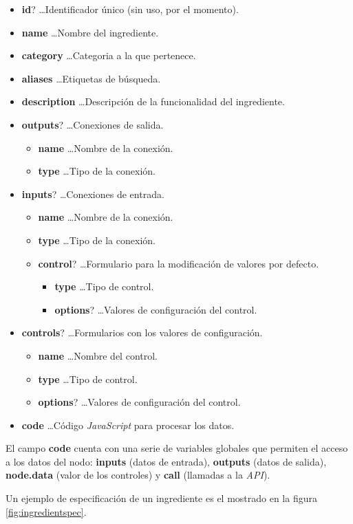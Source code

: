 \begin{itemize}
\item \textbf{id}? \ldots Identificador único (sin uso, por el momento).
\item \textbf{name} \ldots Nombre del ingrediente.
\item \textbf{category} \ldots Categoria a la que pertenece.
\item \textbf{aliases} \ldots Etiquetas de búsqueda.
\item \textbf{description} \ldots Descripción de la funcionalidad del ingrediente.
\item \textbf{outputs}? \ldots Conexiones de salida.
    \begin{itemize}
    \item \textbf{name} \ldots Nombre de la conexión.
    \item \textbf{type} \ldots Tipo de la conexión.
    \end{itemize}
\item \textbf{inputs}? \ldots Conexiones de entrada.
    \begin{itemize}
    \item \textbf{name} \ldots Nombre de la conexión.
    \item \textbf{type} \ldots Tipo de la conexión.
    \item \textbf{control}? \ldots Formulario para la modificación de valores por defecto.
        \begin{itemize}
        \item \textbf{type} \ldots Tipo de control.
        \item \textbf{options}? \ldots Valores de configuración del control.
        \end{itemize}
    \end{itemize}
\item \textbf{controls}? \ldots Formularios con los valores de configuración.
    \begin{itemize}
    \item \textbf{name} \ldots Nombre del control.
    \item \textbf{type} \ldots Tipo de control.
    \item \textbf{options}? \ldots Valores de configuración del control.
    \end{itemize}
\item \textbf{code} \ldots Código \textit{JavaScript} para procesar los datos.
\end{itemize}

El campo \textbf{code} cuenta con una serie de variables globales que permiten el acceso a los datos del nodo: \textbf{inputs} (datos de entrada), \textbf{outputs} (datos de salida), \textbf{node.data} (valor de los controles) y \textbf{call} (llamadas a la \textit{API}).\sn

Un ejemplo de especificación de un ingrediente es el mostrado en la figura \ref{fig:ingredientspec}.\n